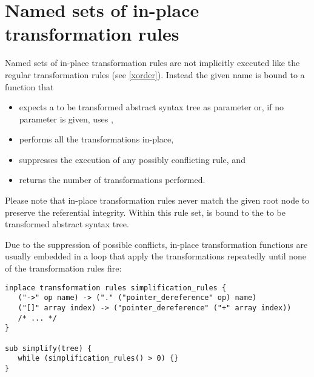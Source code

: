 \begin{grammar}
      \produces {} 
	 \lextoken{\{} 
	 \lextoken{\}}
\end{grammar}

\section{Named sets of in-place transformation rules}
\label{named-inplace-trrules}

Named sets of in-place transformation rules are not implicitly executed
like the regular transformation rules (see \ref{xorder}). Instead the
given name is bound to a function that

\begin{itemize}
   \item expects a to be transformed abstract syntax tree
      as parameter or, if no parameter is given, uses ,
   \item performs all the transformations in-place,
   \item suppresses the execution of any possibly conflicting rule, and
   \item returns the number of transformations performed.
\end{itemize}

Please note that in-place transformation rules never match the
given root node to preserve the referential integrity.
Within this rule set,  is bound to the
to be transformed abstract syntax tree.

\begin{grammar}
      \produces {}
	  
	  \nextline
	 \lextoken{\{} 
	 \lextoken{\}}
\end{grammar}

Due to the suppression of possible conflicts, in-place
transformation functions are usually embedded in a loop
that apply the transformations repeatedly until none
of the transformation rules fire:

\begin{lstlisting}
inplace transformation rules simplification_rules {
   ("->" op name) -> ("." ("pointer_dereference" op) name)
   ("[]" array index) -> ("pointer_dereference" ("+" array index))
   /* ... */
}

sub simplify(tree) {
   while (simplification_rules() > 0) {}
}
\end{lstlisting}

\endinput

